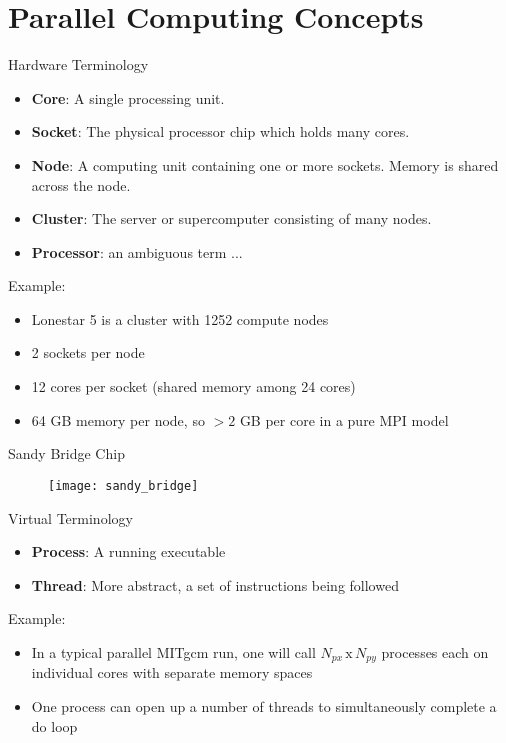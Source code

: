 \documentclass[pdf]{beamer}
\begin{document}

 \section{Parallel Computing Concepts}
 \begin{frame}
  \tableofcontents[currentsection]
 \end{frame}

 \begin{frame}{Hardware Terminology}
  \begin{itemize}
	\item \textbf{Core}: A single processing unit. 
	\item \textbf{Socket}: The physical processor chip which holds many cores.
	\item \textbf{Node}: A computing unit containing one or more sockets. Memory is shared across the node. 
	\item \textbf{Cluster}: The server or supercomputer consisting of many nodes.
	\item \textbf{Processor}: an ambiguous term ...
  \end{itemize} 	
  
  Example: 
  \begin{itemize}
	\item Lonestar 5 is a cluster with 1252 compute nodes 
	\item 2 sockets per node
	\item 12 cores per socket (shared memory among 24 cores)
	\item 64 GB memory per node, so $>2$ GB per core in a pure MPI model 
  \end{itemize}
 \end{frame} 

 \begin{frame}{Sandy Bridge Chip}
	\begin{figure}
	\centering
	\texttt{[image: sandy\_bridge]}
	\end{figure}
 \end{frame}

 \begin{frame}{Virtual Terminology}
  \begin{itemize}
	\item \textbf{Process}: A running executable
	\item \textbf{Thread}: More abstract, a set of instructions being followed
  \end{itemize} 	
  
  Example: 
  \begin{itemize}
	\item In a typical parallel MITgcm run, one will call $N_{px}\, \mathrm{x}\, N_{py}$ processes each on individual cores with separate memory spaces
	\item One process can open up a number of threads to simultaneously complete a do loop 
  \end{itemize}
 \end{frame} 
\end{document}
